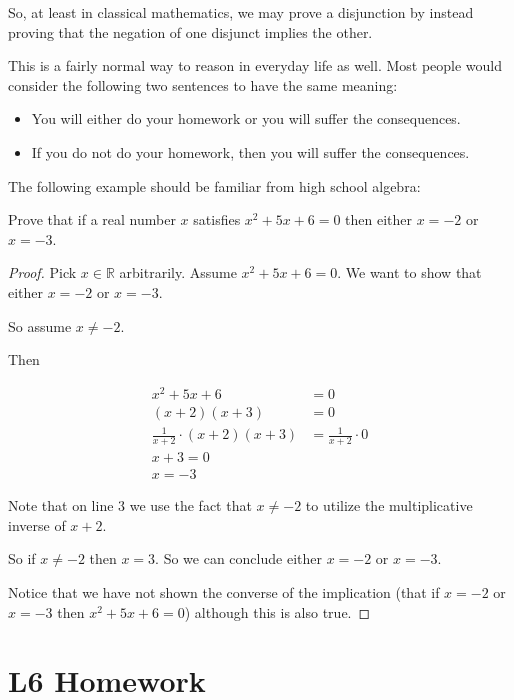 So, at least in classical mathematics, we may prove a disjunction by instead proving that the negation of one disjunct implies the other.

This is a fairly normal way to reason in everyday life as well.  Most people would consider the following two sentences to have the same meaning:

\begin{itemize}
		\item You will either do your homework or you will suffer the consequences.
		\item If you do not do your homework, then you will suffer the consequences.
	\end{itemize}

The following example should be familiar from high school algebra:

\begin{xca}
	Prove that if a real number $x$ satisfies $x^2 + 5x + 6 = 0$ then either $x=-2$ or $x=-3$.
	\end{xca}


\begin{proof}
		Pick $x \in \mathbb{R}$ arbitrarily. Assume $x^2 + 5x + 6 =0$.  We want to show that either $x=-2$ or $x=-3$.
		
		So assume $x \neq -2$.
		
		Then
		
		\begin{align}
			x^2 + 5x + 6 &=0\\
			(x+2)(x+3) &=0\\
			\frac{1}{x+2} \cdot (x+2)(x+3) &=\frac{1}{x+2} \cdot 0\\
			 x + 3 = 0\\
			 x = -3
		\end{align}
	
	Note that on line $3$ we use the fact that $x \neq -2$ to utilize the multiplicative inverse of $x+2$.
	
	So if $x \neq -2$ then $x=3$.  So we can conclude either $x = -2$ or $x = -3$.
	
	Notice that we have not shown the converse of the implication (that if $x = -2$ or $x=-3$ then $x^2 +5x + 6 = 0$) although this is also true.
	\end{proof}

\newpage

\section{L6 Homework}

